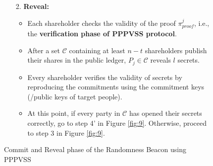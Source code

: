 \begin{figure}[ht]
\begin{tcolorbox}[title=\textbf{Randomness Beacon using PPPVSS}, width=0.9\textwidth, colframe=blue!75!black, colback=blue!10, sharp corners]
\begin{enumerate}
        \item [2.]\textbf{Reveal:}
        \begin{itemize}
            \item Each shareholder checks the validity of the proof 
            $\pi_{proof}^j$, i.e., the \textbf{verification phase of PPPVSS protocol}.
            \item After a set $\mathcal{C}$ containing at least $n-t$ 
            shareholders publish their shares in the public ledger, 
            $P_j\in\mathcal{C}$ reveals $l$ secrets.
            \item Every shareholder verifies the validity of secrets by 
            reproducing the commitments using the commitment keys (/public keys 
            of target people).
            \item At this point, if every party in $\mathcal{C}$ has opened 
            their secrets correctly, go to step 4' in Figure \ref{fig:9}. 
            Otherwise, proceed to step 3 in Figure \ref{fig:9}.
        \end{itemize}
    \end{enumerate}
    \end{tcolorbox}
    \caption{Commit and Reveal phase of the Randomness Beacon using PPPVSS}
    \label{fig:randomness_beacon}
\end{figure}
